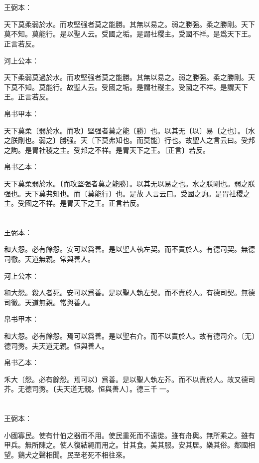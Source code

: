 \documentclass[a5paper]{ctexbook}
\begin{document}
    \chapter{}
    王弼本：

    天下莫柔弱於水。而攻堅强者莫之能勝。其無以易之。弱之勝强。柔之勝剛。天下莫不知。莫能行。是以聖人云。受國之垢。是謂社稷主。受國不祥。是爲天下王。正言若反。

    河上公本：

    天下柔弱莫過於水。而攻堅强者莫之能勝。其無以易之。弱之勝强。柔之勝剛。天下莫不知。莫能行。故聖人云。受國之垢。是謂社稷主。受國之不祥。是謂天下王。正言若反。

    帛书甲本：

    天下莫柔〔弱於水。而攻〕堅强者莫之能〔勝〕也。以其无〔以〕易〔之也〕。〔水之朕剛也。弱之〕勝强。天〔下莫弗知也。而莫能〕行也。故聖人之言云曰。受邦之訽。是胃社稷之主。受邦之不祥。是胃天下之王。〔正言〕若反。

    帛书乙本：

    天下莫柔弱於水。〔而攻堅强者莫之能勝〕。以其无以易之也。水之朕剛也。弱之朕强也。天下莫弗知也。而〔莫能行〕也。是故𦔻人言云曰。受國之訽。是胃社稷之主。受國之不祥。是胃天下之王。正言若反。

    \chapter{}
    王弼本：

    和大怨。必有餘怨。安可以爲善。是以聖人執左契。而不責於人。有德司契。無德司徹。天道無親。常與善人。

    河上公本：

    和大怨。殺人者死。安可以爲善。是以聖人執左契。而不責於人。有德司契。無德司徹。天道無親。常與善人。

    帛书甲本：

    和大怨。必有餘怨。焉可以爲善。是以聖右介。而不以責於人。故有德司介。〔无〕德司勶。夫天道无親。恒與善人。

    帛书乙本：

    禾大〔怨。必有餘怨。焉可以〕爲善。是以聖人執左芥。而不以責於人。故又德司芥。无德司勶。〔夫天道无親。恒與善人〕。德三千𠦜一。

    \chapter{}
    王弼本：

    小國寡民。使有什伯之器而不用。使民重死而不遠徙。雖有舟輿。無所乘之。雖有甲兵。無所陳之。使人復結繩而用之。甘其食。美其服。安其居。樂其俗。鄰國相望。鷄犬之聲相聞。民至老死不相往來。
\end{document}
